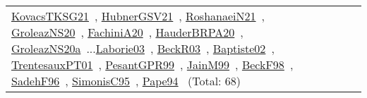 {\begin{longtable}{p{3cm}r>{\raggedright\arraybackslash}p{6cm}>{\raggedright\arraybackslash}p{6cm}>{\raggedright\arraybackslash}p{8cm}}
\href{../works/KovacsTKSG21.pdf}{KovacsTKSG21}~\cite{KovacsTKSG21}, \href{../works/HubnerGSV21.pdf}{HubnerGSV21}~\cite{HubnerGSV21}, \href{../works/RoshanaeiN21.pdf}{RoshanaeiN21}~\cite{RoshanaeiN21}, \href{../works/GroleazNS20.pdf}{GroleazNS20}~\cite{GroleazNS20}, \href{../works/FachiniA20.pdf}{FachiniA20}~\cite{FachiniA20}, \href{../works/HauderBRPA20.pdf}{HauderBRPA20}~\cite{HauderBRPA20}, \href{../works/GroleazNS20a.pdf}{GroleazNS20a}~\cite{GroleazNS20a}...\href{../works/Laborie03.pdf}{Laborie03}~\cite{Laborie03}, \href{../works/BeckR03.pdf}{BeckR03}~\cite{BeckR03}, \href{../works/Baptiste02.pdf}{Baptiste02}~\cite{Baptiste02}, \href{../works/TrentesauxPT01.pdf}{TrentesauxPT01}~\cite{TrentesauxPT01}, \href{../works/PesantGPR99.pdf}{PesantGPR99}~\cite{PesantGPR99}, \href{../works/JainM99.pdf}{JainM99}~\cite{JainM99}, \href{../works/BeckF98.pdf}{BeckF98}~\cite{BeckF98}, \href{../works/SadehF96.pdf}{SadehF96}~\cite{SadehF96}, \href{../works/SimonisC95.pdf}{SimonisC95}~\cite{SimonisC95}, \href{../works/Pape94.pdf}{Pape94}~\cite{Pape94} (Total: 68)\\

\end{longtable}}
